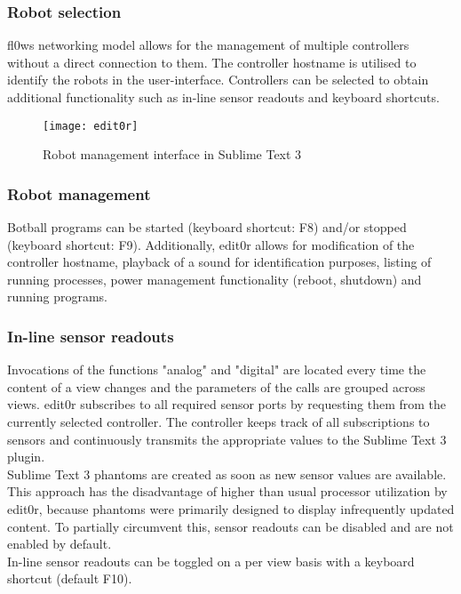 \documentclass[conference]{IEEEtran}
\begin{document}
\subsubsection{Robot selection}
fl0ws\cite{fl0w:Philip Trauner} networking model allows for the management of multiple controllers without a direct connection to them. The controller hostname is utilised to identify the robots in the user-interface. Controllers can be selected to obtain additional functionality such as in-line sensor readouts and keyboard shortcuts.\\

\begin{figure}[H]
\centering
\texttt{[image: edit0r]}
\caption{Robot management interface in Sublime Text 3\cite{Sublime Text 3:Sublime HQ}}
\label{fig:robot_management}
\end{figure}

\subsubsection{Robot management}
Botball programs can be started (keyboard shortcut: F8) and/or stopped (keyboard shortcut: F9).
Additionally, edit0r\cite{edit0r:Philip Trauner} allows for modification of the controller hostname, playback of a sound for identification purposes, listing of running processes, power management functionality (reboot, shutdown) and running programs.\\

\subsubsection{In-line sensor readouts}
Invocations of the functions "analog" and "digital" are located every time the content of a view changes and the parameters of the calls are grouped across views. edit0r\cite{edit0r:Philip Trauner} subscribes to all required sensor ports by requesting them from the currently selected controller. The controller keeps track of all subscriptions to sensors and continuously transmits the appropriate values to the Sublime Text 3\cite{Sublime Text 3:Sublime HQ} plugin. \\Sublime Text 3 \cite{Sublime Text 3:Sublime HQ} phantoms are created as soon as new sensor values are available. This approach has the disadvantage of higher than usual processor utilization by edit0r\cite{edit0r:Philip Trauner}, because phantoms were primarily designed to display infrequently updated content. To partially circumvent this, sensor readouts can be disabled and are not enabled by default.\\
In-line sensor readouts can be toggled on a per view basis with a keyboard shortcut (default F10).\\
\end{document}

